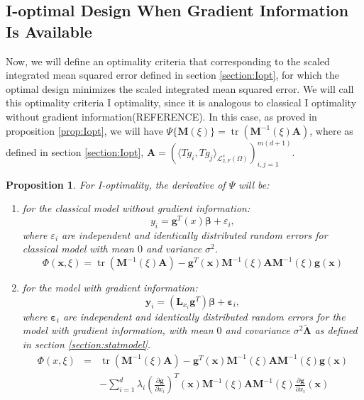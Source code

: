 \documentclass[preprint,12pt]{elsarticle}
\newtheorem{pro}{Proposition}
\DeclareMathOperator{\tr}{tr} \DeclareMathOperator{\err}{err}
\begin{document}
\subsection{I-optimal Design When Gradient Information Is Available}
Now, we will define an optimality criteria that corresponding to the
scaled integrated mean squared error defined in section
\ref{section:Iopt}, for which the optimal design minimizes the
scaled integrated mean squared error. We will call this optimality
criteria I optimality, since it is analogous to classical I
optimality without gradient information(REFERENCE). In this case, as
proved in proposition \ref{prop:Iopt}, we will have
$\Psi\{\boldsymbol{M}(\xi)\}=\tr(\boldsymbol{M}^{-1}(\xi)\boldsymbol{A})$,
where as defined in section \ref{section:Iopt},
$\boldsymbol{A}=\left(\langle Tg_i,Tg_j\rangle_{\mathcal
{L}_{2,F}^s(\Omega)}\right)_{i,j=1}^{m(d+1)}$.

\begin{pro}
\label{prop:Ider}
For I-optimality, the derivative of $\Psi$ will
be:
\begin{enumerate}
\item for the classical model without gradient information:
$$y_i=\boldsymbol{g}^T(x)\boldsymbol{\beta}+\varepsilon_i,$$
where $\varepsilon_i$ are independent and identically distributed
random errors for classical model with mean $0$ and variance
$\sigma^2$.
$$\Phi(\boldsymbol{x},\xi)=\tr(\boldsymbol{M}^{-1}(\xi)\boldsymbol{A})-\boldsymbol{g}^T(\boldsymbol{x})\boldsymbol{M}^{-1}(\xi)\boldsymbol{A}\boldsymbol{M}^{-1}(\xi)\boldsymbol{g}(\boldsymbol{x})$$


\item for the model with gradient information:
$$\boldsymbol{y}_i=(\mathbf{L}_{x_i}\boldsymbol{g}^T)\boldsymbol{\beta}+\boldsymbol{\varepsilon}_i,$$
where $\boldsymbol{\varepsilon}_i$ are independent and identically
distributed random errors for the model with gradient information,
with mean $0$ and covariance
$\sigma^2\widetilde{\boldsymbol{\Lambda}}$ as defined in section
\ref{section:statmodel}.
\begin{eqnarray*}
\Phi(x,\xi)&=&\tr(\boldsymbol{M}^{-1}(\xi)\boldsymbol{A})-\boldsymbol{g}^T(\boldsymbol{x})\boldsymbol{M}^{-1}(\xi)\boldsymbol{A}\boldsymbol{M}^{-1}(\xi)\boldsymbol{g}(\boldsymbol{x})\\
&&-\sum_{i=1}^d\lambda_i\left(\frac{\partial\boldsymbol{g}}{\partial
x_i}\right)^T(\boldsymbol{x})\boldsymbol{M}^{-1}(\xi)\boldsymbol{A}\boldsymbol{M}^{-1}(\xi)\frac{\partial\boldsymbol{g}}{\partial
x_i}(\boldsymbol{x})\\
\end{eqnarray*}
\end{enumerate}
\end{pro}
\end{document}
